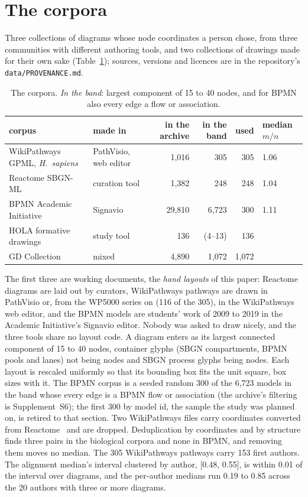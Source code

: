 \documentclass[11pt]{article}
\begin{document}
\section{The corpora}\label{sec:corpora}

Three collections of diagrams whose node coordinates a person chose, from three
communities with different authoring tools, and two collections of drawings made for
their own sake (Table~\ref{tab:corpora}); sources, versions and licences are in the
repository's \texttt{data/PROVENANCE.md}.

\begin{table}[!htbp]\centering\scriptsize\setlength{\tabcolsep}{4pt}
\begin{tabular}{llrrrl}
\toprule
corpus & made in & in the archive & in the band & used & median $m/n$ \\
\midrule
WikiPathways GPML, \emph{H.\ sapiens}~\cite{agrawal24} & PathVisio, web editor & 1,016 & 305 & 305 & 1.06 \\
Reactome SBGN-ML~\cite{fabregat18} & curation tool & 1,382 & 248 & 248 & 1.04 \\
BPMN Academic Initiative~\cite{kunze11, bpmai20} & Signavio & 29,810 & 6,723 & 300 & 1.11 \\
HOLA formative drawings~\cite{hola16} & study tool & 136 & (4--13) & 136 & \\
GD Collection~\cite{gdcoll25} & mixed & 4,890 & 1,072 & 1,072 & \\
\bottomrule
\end{tabular}
\caption{The corpora. \emph{In the band}: largest component of 15 to 40 nodes, and for
BPMN also every edge a flow or association.}
\label{tab:corpora}
\end{table}

The first three are working documents, the \emph{hand layouts} of this paper: Reactome
diagrams are laid out by curators, WikiPathways pathways are drawn in PathVisio or, from
the WP5000 series on (116 of the 305), in the WikiPathways web editor, and the BPMN models
are students' work of 2009 to 2019 in the Academic Initiative's Signavio editor. Nobody was asked to draw nicely, and the three
tools share no layout code. A
diagram enters as its largest connected component of 15 to 40 nodes, container glyphs
(SBGN compartments, BPMN pools and lanes) not being nodes and SBGN process glyphs being
nodes. Each layout is rescaled uniformly so that its bounding box fits the unit square,
box sizes with it. The BPMN corpus is a seeded random 300 of the 6,723 models in the band
whose every edge is a BPMN flow or association (the archive's filtering is
Supplement~S6); the first 300 by model id, the sample the study was planned on, is
retired to that section. Two
WikiPathways files carry coordinates converted from Reactome~\cite{bohler16} and are
dropped. Deduplication by coordinates and by structure finds three pairs in the
biological corpora and none in BPMN, and removing them moves no median. The 305
WikiPathways pathways carry 153 first authors. The alignment median's interval clustered
by author, [0.48, 0.55], is within 0.01 of the interval over diagrams, and the per-author
medians run 0.19 to 0.85 across the 20 authors with three or more diagrams.
\end{document}
